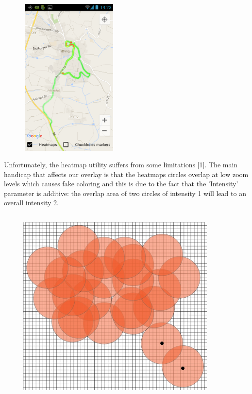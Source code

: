 \documentclass[10pt,a4paper]{article} %
\begin{document}
    \begin{figure}[H]
    \centering
	   
       \includegraphics[width=5cm, height=8cm]{pic4}
       
    \end{figure}
    
    Unfortunately, the heatmap utility suffers from some limitations [1]. The main handicap that affects our overlay is that the heatmaps circles overlap at low zoom levels which causes fake coloring and this is due to the fact that the 'Intensity' parameter is additive: the overlap area of two circles of intensity 1 will lead to an overall intensity 2.
    
    \begin{figure}[H]
    \centering
	
	  
	   
       \includegraphics[width=10cm, height=10cm]{pic6}
    
       
    \end{figure}
    
\end{document}
